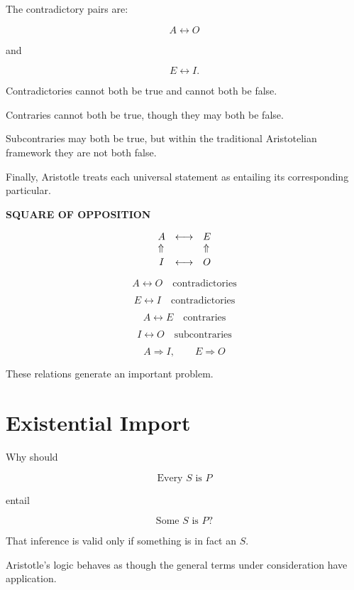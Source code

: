 \documentclass[11pt]{article}
\begin{document}
The contradictory pairs are:

\[
A \leftrightarrow O
\]

and

\[
E \leftrightarrow I.
\]

Contradictories cannot both be true and cannot both be false.

Contraries cannot both be true, though they may both be false.

Subcontraries may both be true, but within the traditional
Aristotelian framework they are not both false.

Finally, Aristotle treats each universal statement as entailing
its corresponding particular.

\begin{whiteboard}
\textbf{SQUARE OF OPPOSITION}

\[
\begin{array}{ccc}
A & \longleftrightarrow & E\\
\rotatebox{90}{$\Rightarrow$} & & \rotatebox{90}{$\Rightarrow$}\\
I & \longleftrightarrow & O
\end{array}
\]

\[
A \leftrightarrow O
\quad\text{contradictories}
\]

\[
E \leftrightarrow I
\quad\text{contradictories}
\]

\[
A \leftrightarrow E
\quad\text{contraries}
\]

\[
I \leftrightarrow O
\quad\text{subcontraries}
\]

\[
A\Rightarrow I,
\qquad
E\Rightarrow O
\]
\end{whiteboard}

These relations generate an important problem.

\section{Existential Import}

Why should

\[
\text{Every }S\text{ is }P
\]

entail

\[
\text{Some }S\text{ is }P?
\]

That inference is valid only if something is in fact an \(S\).

Aristotle's logic behaves as though the general terms under
consideration have application.
\end{document}
